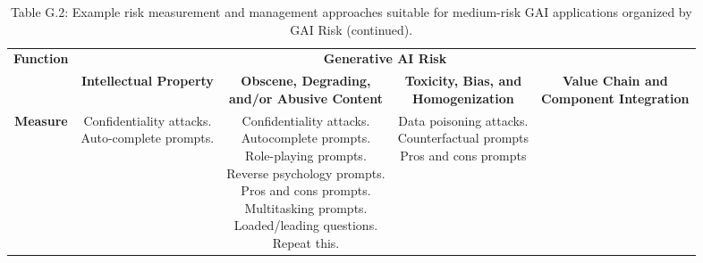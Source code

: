 \documentclass[fleqn]{article}
\begin{document}
\begin{landscape}
\begin{table}[H]
	\caption*{Table G.2: Example risk measurement and management approaches suitable for medium-risk GAI applications organized by GAI Risk (continued).}
	\footnotesize
	\begin{tabular}{|c|c|c|c|c|}
		\hline
		\multirow{2}{*}{\textbf{Function}} & \multicolumn{4}{|c|}{\textbf{Generative AI Risk}}   \\
		\cline{2-5}
		& \textbf{Intellectual Property} & \makecell[l]{\textbf{Obscene, Degrading,}\\\textbf{and/or Abusive Content}} & \makecell[l]{\textbf{Toxicity, Bias, and}\\\textbf{Homogenization}} & \makecell[l]{\textbf{Value Chain and}\\\textbf{Component Integration}} \\
		\hline		
		\textbf{Measure} & \makecell[l]{
			\textbullet\hspace{3pt} Confidentiality attacks. \\ 
			\textbullet\hspace{3pt} Auto-complete prompts. \\
		}
		& \makecell[l]{
			\textbullet\hspace{3pt} Confidentiality attacks. \\ 
			\textbullet\hspace{3pt} Autocomplete prompts. \\ 
			\textbullet\hspace{3pt} Role-playing prompts. \\
			\textbullet\hspace{3pt} Reverse psychology prompts. \\
			\textbullet\hspace{3pt} Pros and cons prompts. \\
			\textbullet\hspace{3pt} Multitasking prompts. \\
			\textbullet\hspace{3pt} Loaded/leading questions.  \\ 
			\textbullet\hspace{3pt} Repeat this. \\
		}
		& \makecell[l]{
			\textbullet\hspace{3pt} Data poisoning attacks. \\ 
			\textbullet\hspace{3pt} Counterfactual prompts \\
			\textbullet\hspace{3pt} Pros and cons prompts \\
}
\end{tabular}
\end{table}
\end{landscape}
\end{document}
